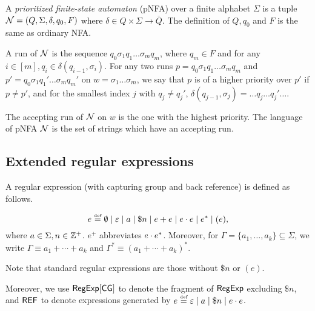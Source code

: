 \begin{definition}
  A \emph{prioritized finite-state automaton} (pNFA) over a finite alphabet $\Sigma$ is a tuple $\mathcal{N}=(Q, \Sigma, \delta, q_0, F)$ where $\delta \in Q
  \times \Sigma \rightarrow \overline{Q}$. The definition of $Q, q_0$ and $F$ is the same as ordinary NFA.
\end{definition}

A run of $\mathcal{N}$ is the sequence $q_0 \sigma_1 q_1 \ldots \sigma_m q_m$, where $q_m \in F$ and for any $i \in [m], q_i \in \delta (q_{i - 1}, \sigma_i)$. For any two runs $p = q_0 \sigma_1 q_1 \ldots \sigma_m q_m$ and $p' =  q_0 \sigma_1 q_1' \ldots \sigma_m q_m'$ on $w = \sigma_1 \ldots \sigma_m$, we say that $p$ is of a higher priority over  $p'$ if $p \neq p'$, and for the smallest index $j$ with $q_j \neq q_j'$, $\delta (q_{j - 1}, \sigma_j) = \ldots q_j \ldots q_j' \ldots$.
  
  The accepting run of $\mathcal{N}$ on $w$ is the one with the highest priority. The language of pNFA $\mathcal{N}$ is the set of
  strings which have an accepting run.
  
  
  
  \subsection{Extended regular expressions}
  
  A regular expression (with capturing group and back reference) is defined as follows.
  
  \begin{definition}
  	\[e \eqdef \emptyset \mid \varepsilon \mid a \mid \$n \mid e + e \mid e \concat e \mid e^* \mid (e)  , \]
  	where $a \in \Sigma, n \in \mathbb{Z}^+$. 
  	$e^+$ abbreviates $e \cdot e^*$. Moreover, for $\Gamma = \{a_1, \ldots, a_k\}\subseteq \Sigma$, we write $\Gamma \equiv a_1 + \cdots + a_k$ and $\Gamma^\ast \equiv (a_1 + \cdots + a_k)^\ast$. 
  \end{definition}
  
  Note that standard regular expressions are those without $\$ n$ or $(e)$.
  
  Moreover, we use ${\sf RegExp}[\sf CG]$ to denote the fragment of ${\sf RegExp}$  excluding $\$ n$, and ${\sf REF}$ to denote expressions generated by $e \eqdef \varepsilon \mid a \mid \$n \mid e \concat e$.
  
